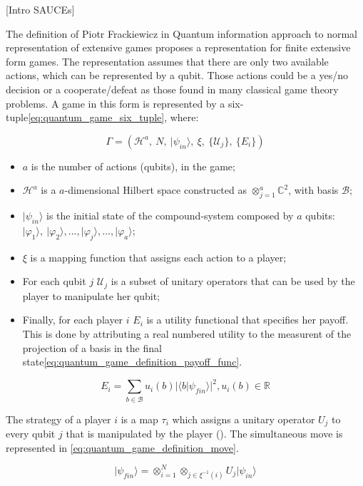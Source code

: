 [Intro SAUCEs]

The definition of Piotr Frackiewicz in Quantum information approach
to normal representation of extensive games proposes a representation
for finite extensive form games. The representation assumes that there
are only two available actions, which can be represented by a qubit.
Those actions could be a yes/no decision or a cooperate/defeat as
those found in many classical game theory problems. A game in this
form is represented by a six-tuple\ref{eq:quantum_game_six_tuple},
where:

\begin{equation}
\Gamma=(\mathcal{H}^{a},\: N,\:\vert\psi_{in}\rangle,\:\xi,\:\{\mathcal{U}_{j}\},\:\{E_{i}\})\label{eq:quantum_game_six_tuple}
\end{equation}

\begin{itemize}
\item $a$ is the number of actions (qubits), in the game; 
\item $\mathcal{H}^{a}$ is a $a$-dimensional Hilbert space constructed
as $\otimes_{j=1}^{a}\mathbb{C}^{2}$, with basis $\mathcal{B}$;
\item $\vert\psi_{in}\rangle$ is the initial state of the compound-system
composed by $a$ qubits: $\vert\varphi_{1}\rangle,\:\vert\varphi_{2}\rangle, ..., \vert\varphi_{j}\rangle, ..., \vert\varphi_{a}\rangle$;
\item $\xi$ is a mapping function that assigns each action to a player;
\item For each qubit $j$ $\mathcal{U}_{j}$ is a subset of unitary operators
that can be used by the player to manipulate her qubit;
\item Finally, for each player $i$ $E_{i}$ is a utility functional that
specifies her payoff. This is done by attributing a real numbered utility to the measurent of the projection of a basis in the final state\ref{eq:quantum_game_definition_payoff_func}.\end{itemize}

\begin{equation}
E_{i}=\sum_{b \in \mathcal{B}} u_{i}(b)\vert \langle b\vert \psi_{fin}\rangle\vert^{2}, u_{i}(b) \in \mathbb{R}
\label{eq:quantum_game_definition_payoff_func}
\end{equation}

The strategy of a player $i$ is a map $\tau_{i}$ which assigns a
unitary operator $U_{j}$ to every qubit $j$ that is manipulated
by the player ().
The simultaneous move is represented in \ref{eq:quantum_game_definition_move}.

\begin{equation}
\vert\psi_{fin}\rangle=\otimes_{i=1}^{N}\otimes_{j\in\xi^{-1}(i)}U_{j}\vert\psi_{in}\rangle\label{eq:quantum_game_definition_move}
\end{equation}
